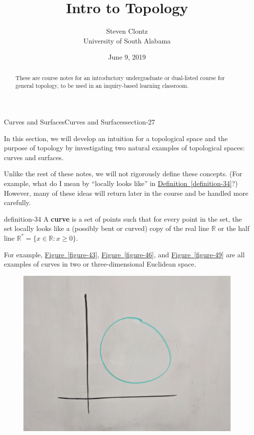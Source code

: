 \documentclass[oneside,10pt,]{article}
\title{Intro to Topology}
\author{Steven Clontz\\
University of South Alabama
}
\date{June 9, 2019}
\newcommand{\terminology}[1]{\textbf{#1}}
\begin{document}
\hypertarget{article-4}{}
\maketitle
\thispagestyle{empty}
\begin{abstract}
\hypertarget{p-14}{}%
These are course notes for an introductory undergraduate or dual-listed course for general topology, to be used in an inquiry-based learning classroom.%
\end{abstract}
%
%
\typeout{************************************************}
\typeout{************************************************}
%
\begin{sectionptx}{Curves and Surfaces}{}{Curves and Surfaces}{}{}{section-27}
\begin{introduction}{}%
\hypertarget{p-30}{}%
In this section, we will develop an intuition for a topological space and the purpose of topology by investigating two natural examples of topological spaces: curves and surfaces.%
\par
\hypertarget{p-31}{}%
Unlike the rest of these notes, we will not rigorously define these concepts. (For example, what do I mean by ``locally looks like'' in \hyperref[definition-34]{Definition~\ref{definition-34}}?)  However, many of these ideas will return later in the course and be handled more carefully.%
\end{introduction}%
\begin{definition}{}{definition-34}%
\hypertarget{p-35}{}%
A \terminology{curve} is a set of points such that for every point in the set, the set locally looks like a (possibly bent or curved) copy of the real line \(\mathbb R\) or the half line \(\mathbb R^*=\{x\in\mathbb R:x\geq 0\}\).%
\end{definition}
\hypertarget{p-39}{}%
For example, \hyperref[figure-43]{Figure~\ref{figure-43}}, \hyperref[figure-46]{Figure~\ref{figure-46}}, and \hyperref[figure-49]{Figure~\ref{figure-49}} are all examples of curves in two or three-dimensional Euclidean space.%
\begin{figure}
\centering
\includegraphics[width=1\linewidth]{images/circle.jpg}

\end{figure}
\end{sectionptx}
\end{document}
